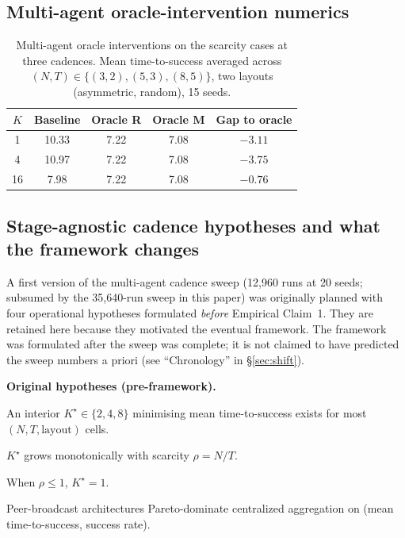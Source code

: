 \documentclass{article}
\begin{document}
\subsection{Multi-agent oracle-intervention numerics}
\label{app:multi-oracle}

\begin{table}[h]
\caption{Multi-agent oracle interventions on the scarcity cases at three cadences. Mean time-to-success averaged across $(N,T)\in\{(3,2),(5,3),(8,5)\}$, two layouts (asymmetric, random), 15 seeds.}
\label{tab:multi-agent-oracle}
\centering
\small
\begin{tabular}{c c c c c}
\toprule
$K$ & Baseline & Oracle R & Oracle M & Gap to oracle \\
\midrule
1  & 10.33 & 7.22 & 7.08 & $-3.11$ \\
4  & 10.97 & 7.22 & 7.08 & $-3.75$ \\
16 &  7.98 & 7.22 & 7.08 & $-0.76$ \\
\bottomrule
\end{tabular}
\end{table}

\subsection{Stage-agnostic cadence hypotheses and what the framework changes}
\label{app:standalone-hypotheses}

A first version of the multi-agent cadence sweep (12{,}960 runs at 20 seeds; subsumed by the 35{,}640-run sweep in this paper) was originally planned with four operational hypotheses formulated \emph{before} Empirical Claim~1. They are retained here because they motivated the eventual framework. The framework was formulated after the sweep was complete; it is not claimed to have predicted the sweep numbers a priori (see ``Chronology'' in \S\ref{sec:shift}).

\textbf{Original hypotheses (pre-framework).}
\begin{description}[leftmargin=10pt,topsep=2pt,itemsep=1pt]
\item[H1.] An interior $K^\star \in \{2,4,8\}$ minimising mean time-to-success exists for most $(N, T, \text{layout})$ cells.
\item[H2.] $K^\star$ grows monotonically with scarcity $\rho = N/T$.
\item[H3.] When $\rho \le 1$, $K^\star = 1$.
\item[H4.] Peer-broadcast architectures Pareto-dominate centralized aggregation on (mean time-to-success, success rate).
\end{description}
\end{document}
